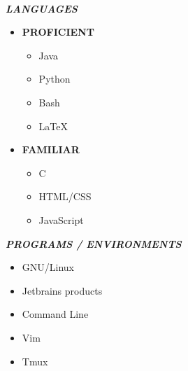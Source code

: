 \documentclass{awesome-cv}
\begin{document}
	\begin{multicols*}{2}

			\\\textbf{\textit{LANGUAGES}}
			\begin{itemize}
				\item \textbf{PROFICIENT}
				\begin{itemize}
					\item Java
					\item Python
					\item Bash
					\item LaTeX		
				\end{itemize}

				\item \textbf{FAMILIAR}
				\begin{itemize}
					\item C
					\item HTML/CSS
					\item JavaScript
				\end{itemize}
			\end{itemize}
				
			\textbf{\textit{PROGRAMS / ENVIRONMENTS}}
			\begin{itemize}
				\item GNU/Linux
				\item Jetbrains products
				\item Command Line
				\item Vim
				\item Tmux
			\end{itemize}

	\end{multicols*}	
\end{document}
